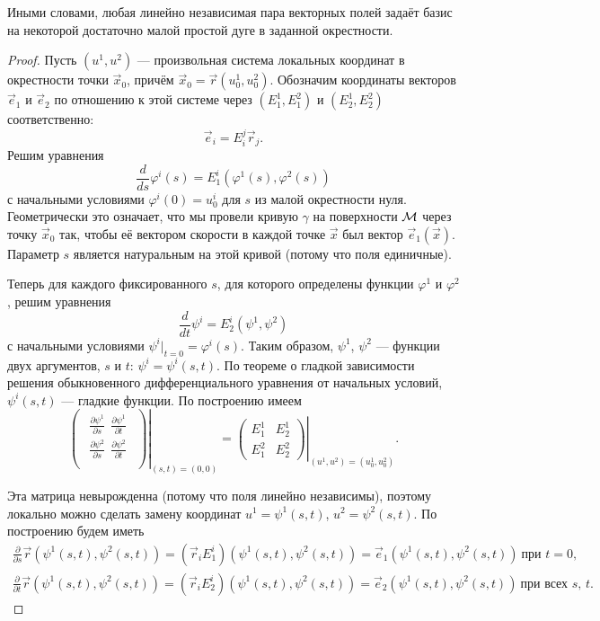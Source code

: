 Иными словами, любая линейно независимая пара векторных полей задаёт базис на некоторой достаточно малой простой дуге в заданной окрестности.

\begin{proof}
	Пусть $(u^1, u^2)$ --- произвольная система локальных координат в окрестности точки $\vec{x}_0$, причём $\vec{x}_0 = \vec{r}(u_0^1, u_0^2)$. Обозначим координаты векторов $\vec{e}_1$ и $\vec{e}_2$ по отношению к этой системе через $(E_1^1, E_1^2)$ и $(E_2^1, E_2^2)$ соответственно:
	\[
		\vec{e}_i = E^j_i\vec{r}_j.
	\]
	Решим уравнения
	\[
		\frac{d}{ds}\varphi^i(s) = E^i_1(\varphi^1(s), \varphi^2(s))
	\]
	с начальными условиями $\varphi^i(0) = u^i_0$ для $s$ из малой окрестности нуля. Геометрически это означает, что мы провели кривую $\gamma$ на поверхности $\mathcal{M}$ через точку $\vec{x}_0$ так, чтобы её вектором скорости в каждой точке $\vec{x}$ был вектор $\vec{e}_1(\vec{x})$. Параметр $s$ является натуральным на этой кривой (потому что поля единичные).

	Теперь для каждого фиксированного $s$, для которого определены функции $\varphi^1$ и $\varphi^2$, решим уравнения
	\[
		\frac{d}{dt}\psi^i = E^i_2(\psi^1, \psi^2)
	\]
	с начальными условиями $\psi^i|_{t = 0} = \varphi^i(s)$. Таким образом, $\psi^1$, $\psi^2$ --- функции двух аргументов, $s$ и $t$: $\psi^i = \psi^i(s, t)$. По теореме о гладкой зависимости решения обыкновенного дифференциального уравнения от начальных условий, $\psi^i(s, t)$ --- гладкие функции. По построению имеем
	\[
		\left.
		\begin{pmatrix} %
			\begin{aligned}
				\frac{\partial\psi^1}{\partial s} \ \ \frac{\partial\psi^1}{\partial t}\\
				\frac{\partial\psi^2}{\partial s} \ \ \frac{\partial\psi^2}{\partial t}\\
			\end{aligned}
		\end{pmatrix}
		\right|_{(s, t) = (0, 0)} =
		\left.
		\begin{pmatrix}
			E_1^1 & E_2^1\\
			E_1^2 & E_2^2
		\end{pmatrix}
		\right|_{(u^1, u^2) = (u^1_0, u^2_0)}.
	\]

	Эта матрица невырожденна (потому что поля линейно независимы), поэтому локально можно сделать замену координат $u^1 = \psi^1(s, t)$, $u^2 = \psi^2(s, t)$. По построению будем иметь
	\begin{gather*}
		\frac{\partial}{\partial s}\vec{r}(\psi^1(s, t), \psi^2(s, t)) = (\vec{r}_iE_1^i)(\psi^1(s, t), \psi^2(s, t)) = \vec{e}_1(\psi^1(s, t), \psi^2(s, t))\ \text{при $t = 0$},\\
		\frac{\partial}{\partial t}\vec{r}(\psi^1(s, t), \psi^2(s, t)) = (\vec{r}_iE_2^i)(\psi^1(s, t), \psi^2(s, t)) = \vec{e}_2(\psi^1(s, t), \psi^2(s, t))\ \text{при всех $s$, $t$}.
	\end{gather*}
\end{proof}

